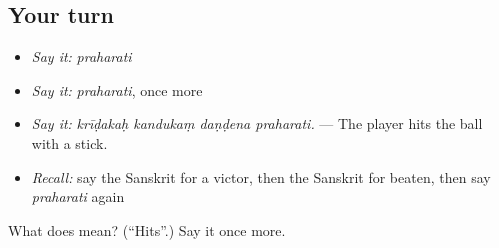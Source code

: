 \subsection*{Your turn}
\begin{itemize}
\raggedright
  \item \emph{Say it:} \emph{praharati}
  \item \emph{Say it:} \emph{praharati}, once more
  \item \emph{Say it:} \emph{krīḍakaḥ kandukaṃ daṇḍena praharati.} — The player hits the ball with a stick.
  \item \emph{Recall:} say the Sanskrit for a victor, then the Sanskrit for beaten, then say \emph{praharati} again
\end{itemize}

\begin{tcolorbox}[breakable,colback=teal!4,colframe=teal!35!black,title={Before you move on}]
What does  mean? (\textquotedblleft{}Hits\textquotedblright{}.) Say it once more.
\end{tcolorbox}
